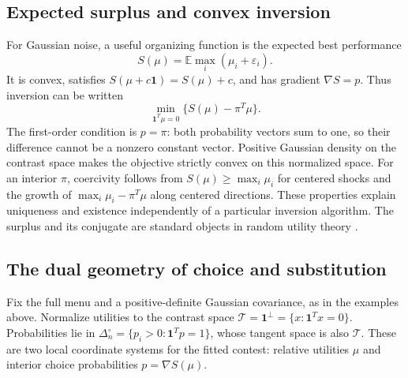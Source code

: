 \documentclass[11pt]{amsart}
\newcommand{\E}{\mathbb E}
\newcommand{\one}{\mathbf 1}
\theoremstyle{definition}
\begin{document}
\subsection{Expected surplus and convex inversion}
For Gaussian noise, a useful organizing function is the expected best performance
\begin{equation}\label{eq:surplus}
 S(\mu)=\E\max_i(\mu_i+\varepsilon_i).
\end{equation}
It is convex, satisfies $S(\mu+c\one)=S(\mu)+c$, and has gradient $\nabla S=p$. Thus inversion can be written
\begin{equation}\label{eq:convex_inverse}
 \min_{\one^T\mu=0}\{S(\mu)-\pi^T\mu\}.
\end{equation}
The first-order condition is $p=\pi$: both probability vectors sum to one, so their difference cannot be a nonzero constant vector. Positive Gaussian density on the contrast space makes the objective strictly convex on this normalized space. For an interior $\pi$, coercivity follows from $S(\mu)\geq\max_i\mu_i$ for centered shocks and the growth of $\max_i\mu_i-\pi^T\mu$ along centered directions. These properties explain uniqueness and existence independently of a particular inversion algorithm. The surplus and its conjugate are standard objects in random utility theory \cite{fosgerau2016,muller2019}.

\subsection{The dual geometry of choice and substitution}\label{subsec:geometry}
Fix the full menu and a positive-definite Gaussian covariance, as in the
examples above. Normalize utilities to the contrast space
$\mathcal T=\one^\perp=\{x:\one^Tx=0\}$. Probabilities lie in
$\Delta_n^\circ=\{p_i>0:\one^Tp=1\}$, whose tangent space is also $\mathcal T$.
These are two local coordinate systems for the fitted contest: relative
utilities $\mu$ and interior choice probabilities $p=\nabla S(\mu)$.
\end{document}
